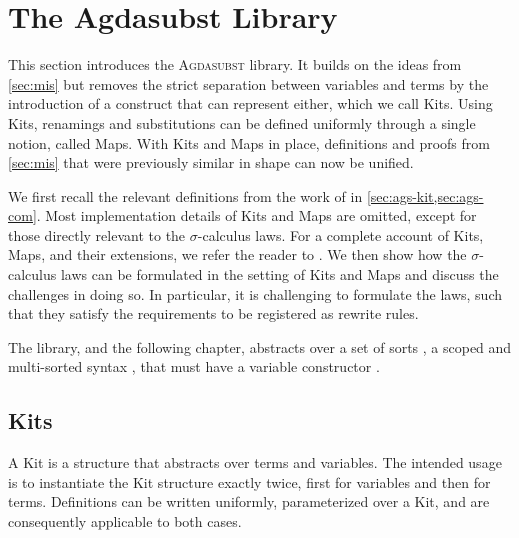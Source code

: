 \documentclass[screen,nonacm]{acmart}
\begin{document}
\section{The Agdasubst Library}\label{sec:ags}
This section introduces the \textsc{Agdasubst} library. It builds on the ideas
from \cref{sec:mis} but removes the strict separation between variables and
terms by the introduction of a construct that can represent either, which we
call Kits. Using Kits, renamings and substitutions can be defined uniformly
through a single notion, called Maps. With Kits and Maps in place, definitions
and proofs from \cref{sec:mis} that were previously similar in shape can now be
unified.

We first recall the relevant definitions from the work of
\citet{saffrich:LIPIcs.ITP.2024.32} in \cref{sec:ags-kit,sec:ags-com}. Most
implementation details of Kits and Maps are omitted, except for those directly
relevant to the $σ$-calculus laws. For a complete account of Kits, Maps, and
their extensions, we refer the reader to \citet{saffrich:LIPIcs.ITP.2024.32}.
We then show how the $σ$-calculus laws can be formulated in the setting of Kits
and Maps and discuss the challenges in doing so. In particular, it is
challenging to formulate the laws, such that they satisfy the requirements to
be registered as rewrite rules.

The library, and the following chapter, abstracts over a set of sorts
\ASortParam, a scoped and multi-sorted syntax \AScopedT, that must have a
variable constructor \AVarCstr.

\subsection{Kits}\label{sec:ags-kit}
A Kit is a structure that abstracts over terms and variables. The intended
usage is to instantiate the Kit structure exactly twice, first for variables
and then for terms. Definitions can be written uniformly, parameterized over a
Kit, and are consequently applicable to both cases.

\begin{minipage}[t]{0.48\linewidth}
      \raggedright{}
      \AKit{}
      \AOpenKit{}
\end{minipage}
\begin{minipage}[t]{0.48\linewidth}
      \raggedright{}
      \AModeDef{}
      \AImage{}
\end{minipage}
\end{document}
